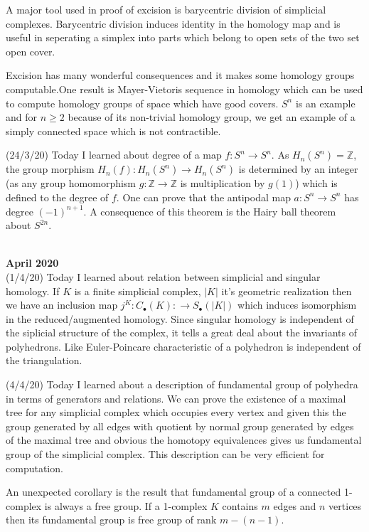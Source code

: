 \documentclass[12pt,a4paper]{article}
\begin{document}
A major tool used in proof of excision is barycentric division of simplicial complexes. Barycentric division induces identity in the homology map and is useful in seperating a simplex into parts which belong to open sets of the two set open cover.

Excision has many wonderful consequences and it makes some homology groups computable.One result is Mayer-Vietoris sequence in homology which can be used to compute homology groups of space which have good covers. $S^n$ is an example and for $n\ge 2$ because of its non-trivial homology group, we get an example of a simply connected space which is not contractible.

(24/3/20) Today I learned about degree of a map $f : S^n \to S^n$. As $H_n(S^n) = \mathbb{Z}$, the group morphism $H_n(f) : H_n(S^n) \to H_n(S^n)$ is determined by an integer (as any group homomorphism $g: \mathbb{Z} \to \mathbb{Z}$ is multiplication by $g(1)$) which is defined to the degree of $f$. One can prove that the antipodal map $a: S^n \to S^n$ has degree $(-1)^{n+1}$. A consequence of this theorem is the Hairy ball theorem about $S^{2n}$.\\
\\	
\maketitle\textbf{April 2020}
\\

(1/4/20) Today I learned about relation between simplicial and singular homology. If $K$ is a finite simplicial complex, $|K|$ it's geometric realization then we have an inclusion map $j^K : C_\bullet(K) : \to S_\bullet(|K|) $ which induces isomorphism in the reduced/augmented homology. Since singular homology is independent of the siplicial structure of the complex, it tells a great deal about the invariants of polyhedrons. Like Euler-Poincare characteristic of a polyhedron is independent of the triangulation.

(4/4/20) Today I learned about a description of fundamental group of polyhedra in terms of generators and relations. We can prove the existence of a maximal tree for any simplicial complex which occupies every vertex and given this the group generated by all edges with quotient by normal group generated by edges of the maximal tree and obvious the homotopy equivalences gives us fundamental group of the simplicial complex. This description can be very efficient for computation.

An unexpected corollary is the result that fundamental group of a connected 1-complex is always a free group. If a 1-complex $K$ contains $m$ edges and $n$ vertices then its fundamental group is free group of rank $m-(n-1)$.
\end{document}
